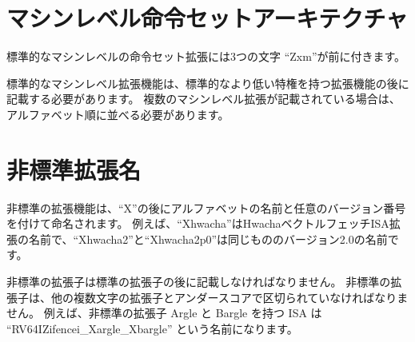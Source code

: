 \begin{comment}
\section{Machine-level Instruction-Set Extensions}
\end{comment}
\section{マシンレベル命令セットアーキテクチャ}

\begin{comment}
Standard machine-level instruction-set extensions are prefixed with the three
letters ``Zxm''.
\end{comment}
標準的なマシンレベルの命令セット拡張には3つの文字 ``Zxm''が前に付きます。

\begin{comment}
Standard machine-level extensions should be listed after standard
lesser-privileged extensions.  If multiple machine-level extensions are listed,
they should be ordered alphabetically.
\end{comment}
標準的なマシンレベル拡張機能は、標準的なより低い特権を持つ拡張機能の後に記載する必要があります。
複数のマシンレベル拡張が記載されている場合は、アルファベット順に並べる必要があります。

\begin{comment}
\section{Non-Standard Extension Names}
\end{comment}
\section{非標準拡張名}

\begin{comment}
Non-standard extensions are named using a single ``X'' followed by an
alphabetical name and an optional version number.
For example, ``Xhwacha'' names the Hwacha vector-fetch ISA extension;
``Xhwacha2'' and ``Xhwacha2p0'' name version 2.0 of same.
\end{comment}
非標準の拡張機能は、``X''の後にアルファベットの名前と任意のバージョン番号を付けて命名されます。
例えば、``Xhwacha''はHwachaベクトルフェッチISA拡張の名前で、``Xhwacha2''と``Xhwacha2p0''は同じもののバージョン2.0の名前です。

\begin{comment}
Non-standard extensions must be listed after all standard extensions.
They must be separated from other multi-letter extensions
by an underscore.  For example, an ISA with non-standard extensions
Argle and Bargle may be named ``RV64IZifencei\_Xargle\_Xbargle''.
\end{comment}
非標準の拡張子は標準の拡張子の後に記載しなければなりません。
非標準の拡張子は、他の複数文字の拡張子とアンダースコアで区切られていなければなりません。
例えば、非標準の拡張子 Argle と Bargle を持つ ISA は ``RV64IZifencei\_Xargle\_Xbargle'' という名前になります。

